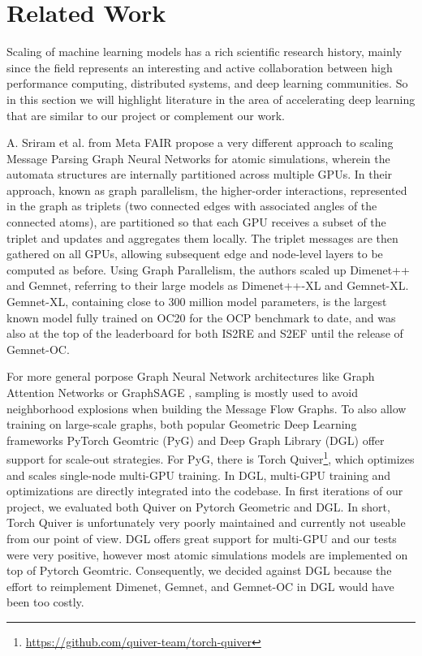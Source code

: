 \section{Related Work}
\label{section:related_work}

Scaling of machine learning models has a rich scientific research history, mainly since the field 
represents an interesting and active collaboration between high performance computing, distributed 
systems, and deep learning communities. So in this section we will highlight literature in the area 
of accelerating deep learning that are similar to our project or complement our work.

A. Sriram et al. \cite*{https://doi.org/10.48550/arxiv.2203.09697} from Meta FAIR propose a very 
different approach to scaling Message Parsing Graph Neural Networks for atomic simulations, wherein 
the automata structures are internally partitioned across multiple GPUs. In their approach, known 
as graph parallelism, the higher-order interactions, represented in the graph as triplets 
(two connected edges with associated angles of the connected atoms), are partitioned so that 
each GPU receives a subset of the triplet and updates and aggregates them locally. The 
triplet messages are then gathered on all GPUs, allowing subsequent edge and node-level layers 
to be computed as before. Using Graph Parallelism, the authors scaled up Dimenet++ and Gemnet, 
referring to their large models as Dimenet++-XL and Gemnet-XL. Gemnet-XL, containing close to 300 
million model parameters, is the largest known model fully trained on OC20 for the OCP benchmark 
to date, and was also at the top of the leaderboard for both IS2RE and S2EF until the release of 
Gemnet-OC. 

For more general porpose Graph Neural Network architectures like Graph Attention Networks 
\cite*{10.48550/ARXIV.1710.10903} or GraphSAGE \cite*{10.48550/ARXIV.1706.02216}, sampling 
is mostly used to avoid neighborhood explosions when building the Message Flow Graphs. To also 
allow training on large-scale graphs, both popular Geometric Deep Learning frameworks PyTorch 
Geomtric (PyG) \cite*{10.48550/ARXIV.1903.02428} and Deep Graph Library (DGL) 
\cite*{10.48550/ARXIV.1909.01315} offer support for scale-out strategies. For PyG, there is 
Torch Quiver\footnote{\url{https://github.com/quiver-team/torch-quiver}}, which optimizes and 
scales single-node multi-GPU training. In DGL, multi-GPU training and optimizations are directly 
integrated into the codebase. In first iterations of our project, we evaluated both Quiver 
on Pytorch Geometric and DGL. In short, Torch Quiver is unfortunately very poorly maintained 
and currently not useable from our point of view. DGL offers great support for multi-GPU and 
our tests were very positive, however most atomic simulations models are implemented on top 
of Pytorch Geomtric. Consequently, we decided against DGL because the effort to reimplement 
Dimenet, Gemnet, and Gemnet-OC in DGL would have been too costly. 

